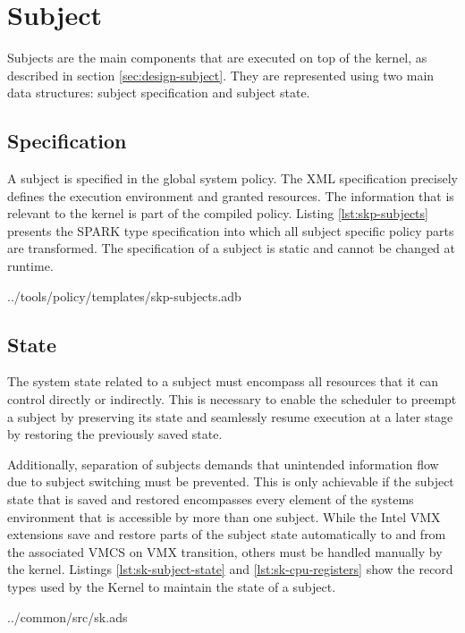 \section{Subject}\label{sec:impl-subject}
Subjects are the main components that are executed on top of the kernel, as
described in section \ref{sec:design-subject}. They are represented using two
main data structures: subject specification and subject state.

\subsection{Specification}
A subject is specified in the global system policy. The XML specification
precisely defines the execution environment and granted resources. The
information that is relevant to the kernel is part of the compiled policy.
Listing \ref{lst:skp-subjects} presents the SPARK type specification into which
all subject specific policy parts are transformed. The specification of a
subject is static and cannot be changed at runtime.


	{../tools/policy/templates/skp-subjects.adb}

\subsection{State}
The system state related to a subject must encompass all resources that it can
control directly or indirectly. This is necessary to enable the scheduler to
preempt a subject by preserving its state and seamlessly resume execution at a
later stage by restoring the previously saved state.

Additionally, separation of subjects demands that unintended information flow
due to subject switching must be prevented. This is only achievable if the
subject state that is saved and restored encompasses every element of the
systems environment that is accessible by more than one subject. While the Intel
VMX extensions save and restore parts of the subject state automatically to and
from the associated VMCS on VMX transition, others must be handled manually by
the kernel. Listings \ref{lst:sk-subject-state} and \ref{lst:sk-cpu-registers}
show the record types used by the Kernel to maintain the state of a subject.


	{../common/src/sk.ads}

